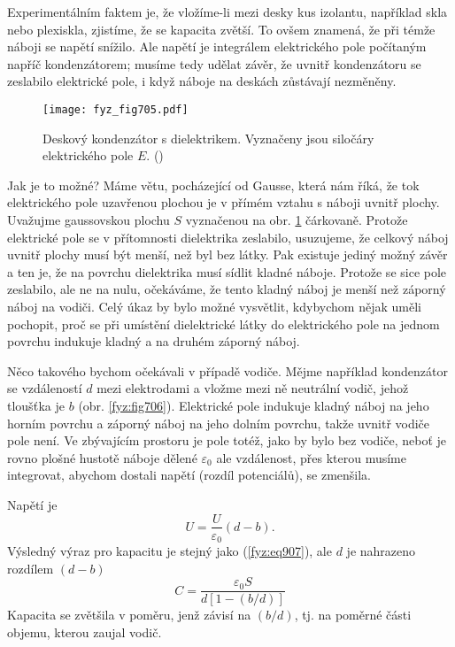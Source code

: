     Experimentálním faktem je, že vložíme-li mezi desky kus izolantu, například skla nebo plexiskla,
    zjistíme, že se kapacita zvětší. To ovšem znamená, že při témže náboji se napětí snížilo. Ale
    napětí je integrálem elektrického pole počítaným napříč kondenzátorem; musíme tedy udělat závěr,
    že uvnitř kondenzátoru se zeslabilo elektrické pole, i když náboje na deskách zůstávají
    nezměněny.

    \begin{figure}[ht!] %
      \centering
      \texttt{[image: fyz\_fig705.pdf]}
      \caption{Deskový kondenzátor s dielektrikem. Vyznačeny jsou siločáry elektrického pole \(E\).
               (\cite[s.~175]{Feynman02})}
      \label{fyz:fig705}
    \end{figure}

    Jak je to možné? Máme větu, pocházející od Gausse, která nám říká, že tok elektrického pole
    uzavřenou plochou je v přímém vztahu s náboji uvnitř plochy. Uvažujme gaussovskou plochu \(S\)
    vyznačenou na obr. \ref{fyz:fig705} čárkovaně. Protože elektrické pole se v přítomnosti
    dielektrika zeslabilo, usuzujeme, že celkový náboj uvnitř plochy musí být menší, než byl bez
    látky. Pak existuje jediný možný závěr a ten je, že na povrchu dielektrika musí sídlit kladné
    náboje. Protože se sice pole zeslabilo, ale ne na nulu, očekáváme, že tento kladný náboj je
    menší než záporný náboj na vodiči. Celý úkaz by bylo možné vysvětlit, kdybychom nějak uměli
    pochopit, proč se při umístění dielektrické látky do elektrického pole na jednom povrchu
    indukuje kladný a na druhém záporný náboj.

    Něco takového bychom očekávali v případě vodiče. Mějme například kondenzátor se vzdáleností
    \(d\) mezi elektrodami a vložme mezi ně neutrální vodič, jehož tloušťka je \(b\) (obr.
    \ref{fyz:fig706}). Elektrické pole indukuje kladný náboj na jeho horním povrchu a záporný náboj
    na jeho dolním povrchu, takže uvnitř vodiče pole není. Ve zbývajícím prostoru je pole totéž,
    jako by bylo bez vodiče, neboť je rovno plošné hustotě náboje dělené \(\varepsilon_0\) ale
    vzdálenost, přes kterou musíme integrovat, abychom dostali napětí (rozdíl potenciálů), se
    zmenšila.

    Napětí je
    \begin{equation*}
      U = \dfrac{U}{\varepsilon_0}(d-b).
    \end{equation*}
    Výsledný výraz pro kapacitu je stejný jako (\ref{fyz:eq907}), ale \(d\) je nahrazeno rozdílem
    \((d - b)\)
    \begin{equation}\label{fyz:eq909}
      C = \dfrac{\varepsilon_0S}{d\left[1 - (b/d)\right]}
    \end{equation}
    Kapacita se zvětšila v poměru, jenž závisí na \((b/d)\), tj. na poměrné části objemu, kterou
    zaujal vodič.

